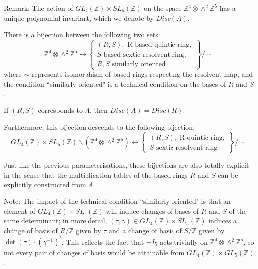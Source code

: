 \documentclass{report}
\begin{document}
Remark: The action of $GL_4(\mathbb{Z}) \times SL_5(\mathbb{Z})$ on the space $\mathbb{Z}^4 \otimes \wedge^2 \mathbb{Z}^5$ has a unique polynomial invariant, which we denote by $Disc(A)$.

\begin{theorem}[Bhargava]
There is a bijection between the following two sets:
\begin{equation}
\mathbb{Z}^4 \otimes \wedge^2 \mathbb{Z}^5 \leftrightarrow
\left \{ \begin{array}{l}
(R,S), \text{ R based quintic ring}, \\
S \text{ based sextic resolvent ring}, \\
R,S \text{ similarly oriented}
\end{array}
\right \} / \sim
\end{equation}
where $\sim$ represents isomorphism of based rings respecting the resolvent map, and the condition ``similarly oriented" is a technical condition on the bases of $R$ and $S$.

If $(R,S)$ corresponds to $A$, then $Disc(A) = Disc(R)$.

Furthermore, this bijection descends to the following bijection:
\begin{equation}
GL_4(\mathbb{Z}) \times SL_5(\mathbb{Z}) \backslash (\mathbb{Z}^4 \otimes \wedge^2 \mathbb{Z}^5) \leftrightarrow
\left \{ \begin{array}{l}
(R,S), \text{ R quintic ring}, \\
S \text{ sextic resolvent ring}
\end{array}
\right \} / \sim
\end{equation}
\end{theorem}

Just like the previous parameterisations, these bijections are also totally explicit in the sense that the multiplication tables of the based rings $R$ and $S$ can be explicitly constructed from $A$.

Note: The impact of the technical condition ``similarly oriented" is that an element of $GL_4(\mathbb{Z}) \times SL_5(\mathbb{Z})$ will induce changes of bases of $R$ and $S$ of the same determinant; in more detail, $(\tau,\gamma) \in GL_4(\mathbb{Z}) \times SL_5(\mathbb{Z})$ induces a change of basis of $R / \mathbb{Z}$ given by $\tau$ and a change of basis of $S / \mathbb{Z}$ given by $\det(\tau) \cdot (\gamma^{-1})^t$.  This reflects the fact that $-I_5$ acts trivially on $\mathbb{Z}^4 \otimes \wedge^2 \mathbb{Z}^5$, so not every pair of changes of basis would be attainable from $GL_4(\mathbb{Z}) \times GL_5(\mathbb{Z})$.
\end{document}
